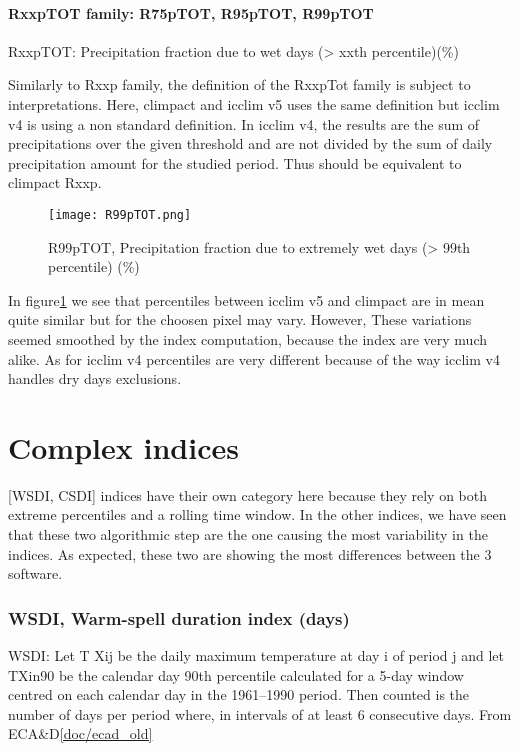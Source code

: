 \documentclass[a4paper,11pt]{article}
\begin{document}
\subsection{RxxpTOT family: R75pTOT, R95pTOT, R99pTOT}
    RxxpTOT: Precipitation fraction due to wet days (> xxth percentile)(\%)

    Similarly to Rxxp family, the definition of the RxxpTot family is subject to interpretations. Here, climpact and icclim v5 uses the same definition but icclim v4 is using a non standard definition. In icclim v4, the results are the sum of precipitations over the given threshold and are not divided by the sum of daily precipitation amount for the studied period. Thus should be equivalent to climpact Rxxp.

    \begin{figure}
        \centering
        \texttt{[image: R99pTOT.png]}
        \caption{R99pTOT, Precipitation fraction due to extremely wet days (> 99th percentile) (\%)}
        \label{figure/r99ptot}
    \end{figure}

    In figure\ref{figure/r99ptot} we see that percentiles between icclim v5 and climpact are in mean quite similar but for the choosen pixel may vary.
    However, These variations seemed smoothed by the index computation, because the index are very much alike.
    As for icclim v4 percentiles are very different because of the way icclim v4 handles dry days exclusions.  


\part{Complex indices}
    [WSDI, CSDI] indices have their own category here because they rely on both extreme percentiles and a rolling time window.
    In the other indices, we have seen that these two algorithmic step are the one causing the most variability in the indices.
    As expected, these two are showing the most differences between the 3 software.

\section{WSDI, Warm-spell duration index (days)}
    WSDI: Let T Xij be the daily maximum temperature at day i of period j and let
    TXin90 be the calendar day 90th percentile calculated for a 5-day window
    centred on each calendar day in the 1961–1990 period. Then counted is the
    number of days per period where, in intervals of at least 6 consecutive days. From ECA\&D\ref{doc/ecad_old}
\end{document}
